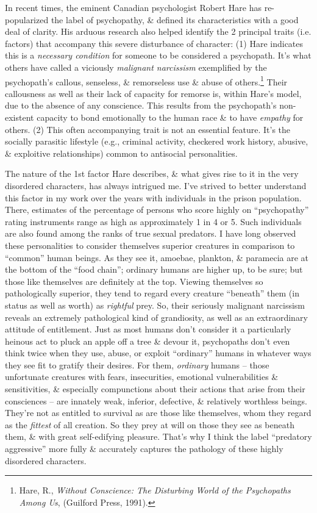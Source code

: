 \documentclass{article}
\numberwithin{equation}{section}
\begin{document}
In recent times, the eminent Canadian psychologist Robert Hare has re-popularized the label of psychopathy, \& defined its characteristics with a good deal of clarity. His arduous research also helped identify the 2 principal traits (i.e. factors) that accompany this severe disturbance of character: (1) Hare indicates this is a \textit{necessary condition} for someone to be considered a psychopath. It's what others have called a viciously \textit{malignant narcissism} exemplified by the psychopath's callous, senseless, \& remorseless use \& abuse of others.\footnote{Hare, R., \textit{Without Conscience: The Disturbing World of the Psychopaths Among Us}, (Guilford Press, 1991).} Their callousness as well as their lack of capacity for remorse is, within Hare's model, due to the absence of any conscience. This results from the psychopath's non-existent capacity to bond emotionally to the human race \& to have \textit{empathy} for others. (2) This often accompanying trait is not an essential feature. It's the socially parasitic lifestyle (e.g., criminal activity, checkered work history, abusive, \& exploitive relationships) common to antisocial personalities.

The nature of the 1st factor Hare describes, \& what gives rise to it in the very disordered characters, has always intrigued me. I've strived to better understand this factor in my work over the years with individuals in the prison population. There, estimates of the percentage of persons who score highly on ``psychopathy'' rating instruments range as high as approximately 1 in 4 or 5. Such individuals are also found among the ranks of true sexual predators. I have long observed these personalities to consider themselves superior creatures in comparison to ``common'' human beings. As they see it, amoebae, plankton, \& paramecia are at the bottom of the ``food chain''; ordinary humans are higher up, to be sure; but those like themselves are definitely at the top. Viewing themselves so pathologically superior, they tend to regard every creature ``beneath'' them (in status as well as worth) as \textit{rightful} prey. So, their seriously malignant narcissism reveals an extremely pathological kind of grandiosity, as well as an extraordinary attitude of entitlement. Just as most humans don't consider it a particularly heinous act to pluck an apple off a tree \& devour it, psychopaths don't even think twice when they use, abuse, or exploit ``ordinary'' humans in whatever ways they see fit to gratify their desires. For them, \textit{ordinary} humans -- those unfortunate creatures with fears, insecurities, emotional vulnerabilities \& sensitivities, \& especially compunctions about their actions that arise from their consciences -- are innately weak, inferior, defective, \& relatively worthless beings. They're not as entitled to survival as are those like themselves, whom they regard as the \textit{fittest} of all creation. So they prey at will on those they see as beneath them, \& with great self-edifying pleasure. That's why I think the label ``predatory aggressive'' more fully \& accurately captures the pathology of these highly disordered characters.
\end{document}
